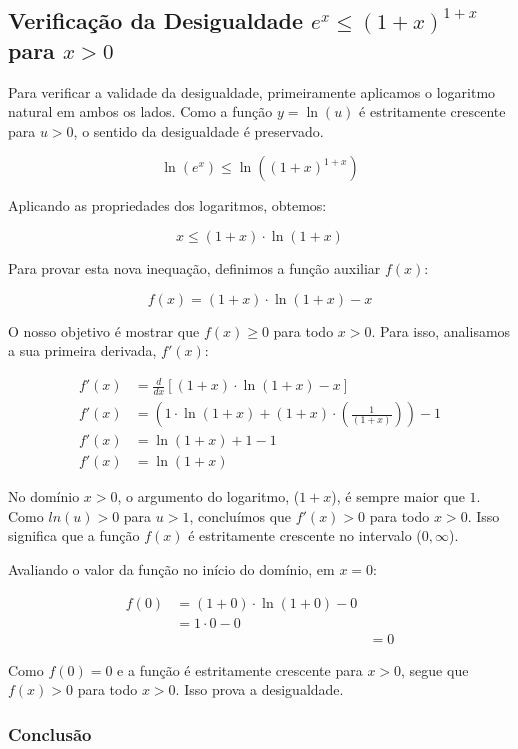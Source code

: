 \documentclass[../resumo.tex]{subfiles}
\begin{document}
	\subsection{Verificação da Desigualdade $e^x \leq (1+x)^{1+x}$ para $x > 0$}

	Para verificar a validade da desigualdade, primeiramente aplicamos o logaritmo natural em ambos
	os lados. Como a função $y = \ln(u)$ é estritamente crescente para $u > 0$, o sentido da
	desigualdade é preservado.

	\[ \ln(e^x) \leq \ln((1+x)^{1+x}) \]

	Aplicando as propriedades dos logaritmos, obtemos:

	\[ x \leq (1+x) \cdot \ln(1+x) \]

	Para provar esta nova inequação, definimos a função auxiliar $f(x)$:

	\[ f(x) = (1+x) \cdot \ln(1+x) - x \]

	O nosso objetivo é mostrar que $f(x) \geq 0$ para todo $x > 0$. Para isso, analisamos a sua
	primeira derivada, $f'(x)$:

	\begin{align*}
		f'(x) &= \frac{d}{dx}[(1+x) \cdot \ln(1+x) - x] \\
		f'(x) &= \left(1 \cdot \ln(1+x) + (1+x) \cdot \left(\frac{1}{(1+x)}\right)\right) - 1 \\
		f'(x) &= \ln(1+x) + 1 - 1 \\
		f'(x) &= \ln(1+x)
	\end{align*}

	No domínio $x > 0$, o argumento do logaritmo, ($1+x$), é sempre maior que $1$. Como $ln(u) > 0$ para
	$u > 1$, concluímos que $f'(x) > 0$ para todo $x > 0$. Isso significa que a função $f(x)$
	é estritamente crescente no intervalo ($0, \infty$).

	Avaliando o valor da função no início do domínio, em $x = 0$:

	\begin{align*}
		f(0) &= (1+0) \cdot \ln(1+0) - 0 \\
				 &= 1 \cdot 0 - 0 \\&
				 &= 0
	\end{align*}

	Como $f(0) = 0$ e a função é estritamente crescente para $x > 0$, segue que $f(x) > 0$ para todo $x > 0$. Isso prova a desigualdade.

	\subsubsection{Conclusão}
\end{document}
